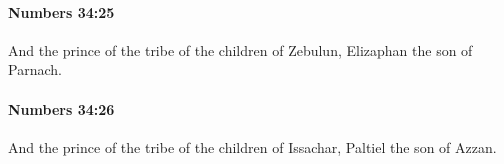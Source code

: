		\paragraph{Numbers 34:25} %
			\label{NUMBERS-34-25}

			And the prince of the tribe of the children of Zebulun, Elizaphan the son of Parnach.


		\paragraph{Numbers 34:26} %
			\label{NUMBERS-34-26}

			And the prince of the tribe of the children of Issachar, Paltiel the son of Azzan.


